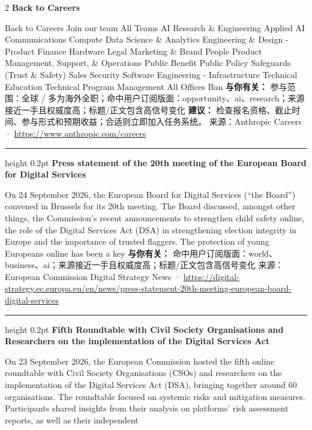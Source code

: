 \documentclass[10.5pt]{ctexart}
\begin{document}
\begin{multicols}{2}
{\large\bfseries Back to Careers}\par
Back to Careers Join our team All Teams AI Research \& Engineering Applied AI Communications Compute Data Science \& Analytics Engineering \& Design - Product Finance Hardware Legal Marketing \& Brand People Product Management, Support, \& Operations Public Benefit Public Policy Safeguards (Trust \& Safety) Sales Security Software Engineering - Infrastructure Technical Education Technical Program Management All Offices Ban
\textbf{与你有关：} 参与范围：全球 / 多为海外全职；命中用户订阅版面：opportunity、ai、research；来源接近一手且权威度高；标题/正文包含高信号变化
\textbf{建议：} 检查报名资格、截止时间、参与形式和预期收益；合适则立即加入任务系统。
{\footnotesize\color{ormuted} 来源：Anthropic Careers · \url{https://www.anthropic.com/careers}}
\vspace{2mm}
\hrule height 0.2pt
\vspace{2mm}
{\large\bfseries Press statement of the 20th meeting of the European Board for Digital Services}\par
On 24 September 2026, the European Board for Digital Services (“the Board”) convened in Brussels for its 20th meeting. The Board discussed, amongst other things, the Commission’s recent announcements to strengthen child safety online, the role of the Digital Services Act (DSA) in strengthening election integrity in Europe and the importance of trusted flaggers. The protection of young Europeans online has been a key 
\textbf{与你有关：} 命中用户订阅版面：world、business、ai；来源接近一手且权威度高；标题/正文包含高信号变化
{\footnotesize\color{ormuted} 来源：European Commission Digital Strategy News · \url{https://digital-strategy.ec.europa.eu/en/news/press-statement-20th-meeting-european-board-digital-services}}
\vspace{2mm}
\hrule height 0.2pt
\vspace{2mm}
{\large\bfseries Fifth Roundtable with Civil Society Organisations and Researchers on the implementation of the Digital Services Act}\par
On 23 September 2026, the European Commission hosted the fifth online roundtable with Civil Society Organisations (CSOs) and researchers on the implementation of the Digital Services Act (DSA), bringing together around 60 organisations. The roundtable focused on systemic risks and mitigation measures. Participants shared insights from their analysis on platforms’ risk assessment reports, as well as their independent 

\end{multicols}
\end{document}
